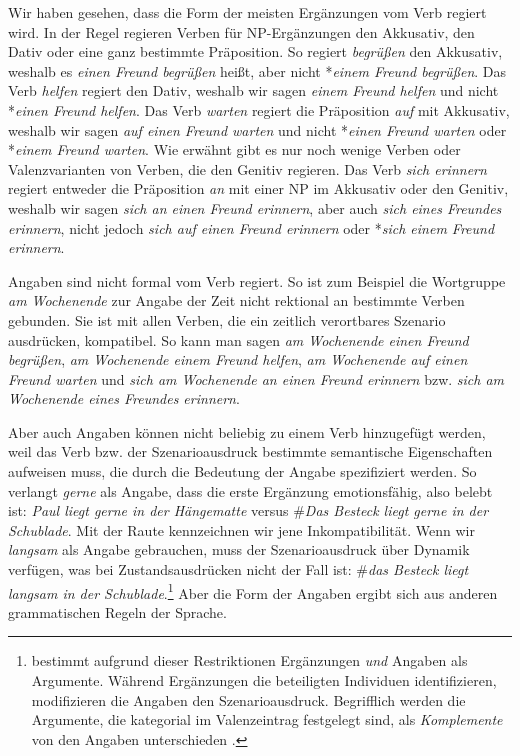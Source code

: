 Wir haben gesehen, dass die Form der meisten Ergänzungen vom Verb regiert wird. In der Regel regieren Verben für NP-Ergänzungen den Akkusativ, den Dativ oder eine ganz bestimmte Präposition. So regiert \textit{begrüßen} den Akkusativ, weshalb es \textit{einen Freund begrüßen} heißt, aber nicht *\textit{einem Freund begrüßen}. Das Verb \textit{helfen} regiert den Dativ, weshalb wir sagen \textit{einem Freund helfen} und nicht *\textit{einen Freund helfen}. Das Verb \textit{warten} regiert die Präposition \textit{auf} mit Akkusativ, weshalb wir sagen \textit{auf einen Freund warten} und nicht *\textit{einen Freund warten} oder *\textit{einem Freund warten}. Wie erwähnt gibt es nur noch wenige Verben oder Valenzvarianten von Verben, die den Genitiv regieren. Das Verb \textit{sich erinnern} regiert entweder die Präposition \textit{an} mit einer NP im Akkusativ oder den Genitiv, weshalb wir sagen \textit{sich an einen Freund erinnern}, aber auch \textit{sich eines Freundes erinnern}, nicht jedoch \textit{sich auf einen Freund erinnern} oder *\textit{sich einem Freund erinnern}. 


Angaben sind nicht formal vom Verb regiert. So ist zum Beispiel die Wortgruppe \textit{am Wochenende} zur Angabe der Zeit nicht rektional an bestimmte Verben gebunden. Sie ist mit allen Verben, die ein zeitlich verortbares Szenario ausdrücken, kompatibel. So kann man sagen \textit{am Wochenende einen Freund begrüßen}, \textit{am Wochenende einem Freund helfen}, \textit{am Wochenende auf einen Freund warten} und \textit{sich am Wochenende an einen Freund erinnern} bzw. \textit{sich am Wochenende eines Freundes erinnern}.  

Aber auch Angaben können nicht beliebig zu einem Verb hinzugefügt werden, weil das Verb bzw. der Szenarioausdruck bestimmte semantische Eigenschaften aufweisen muss, die durch die Bedeutung der Angabe spezifiziert werden. So verlangt \textit{gerne} als Angabe, dass die erste Ergänzung emotionsfähig, also belebt ist: \textit{Paul liegt gerne in der Hängematte} versus \#\textit{Das Besteck liegt gerne in der Schublade}. Mit der Raute kennzeichnen wir jene Inkompatibilität. Wenn wir \textit{langsam} als Angabe gebrauchen, muss der Szenarioausdruck über Dynamik verfügen, was bei Zustandsausdrücken nicht der Fall ist: \#\textit{das Besteck liegt langsam in der Schublade}.\footnote{\citet[388]{Jacobs2003} bestimmt aufgrund dieser Restriktionen Ergänzungen \textit{und} Angaben als Argumente. Während Ergänzungen die beteiligten Individuen identifizieren, modifizieren die Angaben den Szenarioausdruck. Begrifflich werden die Argumente, die kategorial im Valenzeintrag festgelegt sind, als \textit{Komplemente} von den Angaben unterschieden \citep[391]{Jacobs2003}.} Aber die Form der Angaben ergibt sich aus anderen grammatischen Regeln der Sprache.

